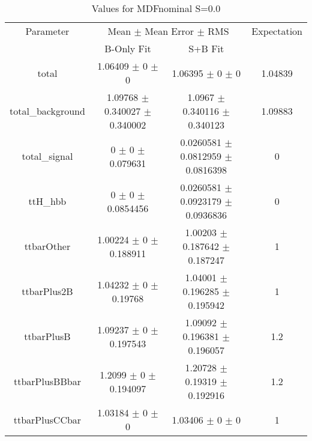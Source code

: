 \begin{table}
\centering
\caption{Values for MDFnominal S=0.0}
\begin{tabular}{cccc}
\toprule
Parameter & \multicolumn{2}{c}{Mean $\pm$ Mean Error $\pm$ RMS} & Expectation\\
 & B-Only Fit & S+B Fit & \\
\midrule
total & \num{1.06409} $\pm$ \num{0} $\pm$ \num{0} & \num{1.06395} $\pm$ \num{0} $\pm$ \num{0} & \num{1.04839}\\
total\_background & \num{1.09768} $\pm$ \num{0.340027} $\pm$ \num{0.340002} & \num{1.0967} $\pm$ \num{0.340116} $\pm$ \num{0.340123} & \num{1.09883}\\
total\_signal & \num{0} $\pm$ \num{0} $\pm$ \num{0.079631} & \num{0.0260581} $\pm$ \num{0.0812959} $\pm$ \num{0.0816398} & \num{0}\\
ttH\_hbb & \num{0} $\pm$ \num{0} $\pm$ \num{0.0854456} & \num{0.0260581} $\pm$ \num{0.0923179} $\pm$ \num{0.0936836} & \num{0}\\
ttbarOther & \num{1.00224} $\pm$ \num{0} $\pm$ \num{0.188911} & \num{1.00203} $\pm$ \num{0.187642} $\pm$ \num{0.187247} & \num{1}\\
ttbarPlus2B & \num{1.04232} $\pm$ \num{0} $\pm$ \num{0.19768} & \num{1.04001} $\pm$ \num{0.196285} $\pm$ \num{0.195942} & \num{1}\\
ttbarPlusB & \num{1.09237} $\pm$ \num{0} $\pm$ \num{0.197543} & \num{1.09092} $\pm$ \num{0.196381} $\pm$ \num{0.196057} & \num{1.2}\\
ttbarPlusBBbar & \num{1.2099} $\pm$ \num{0} $\pm$ \num{0.194097} & \num{1.20728} $\pm$ \num{0.19319} $\pm$ \num{0.192916} & \num{1.2}\\
ttbarPlusCCbar & \num{1.03184} $\pm$ \num{0} $\pm$ \num{0} & \num{1.03406} $\pm$ \num{0} $\pm$ \num{0} & \num{1}\\
\bottomrule
\end{tabular}
\end{table}